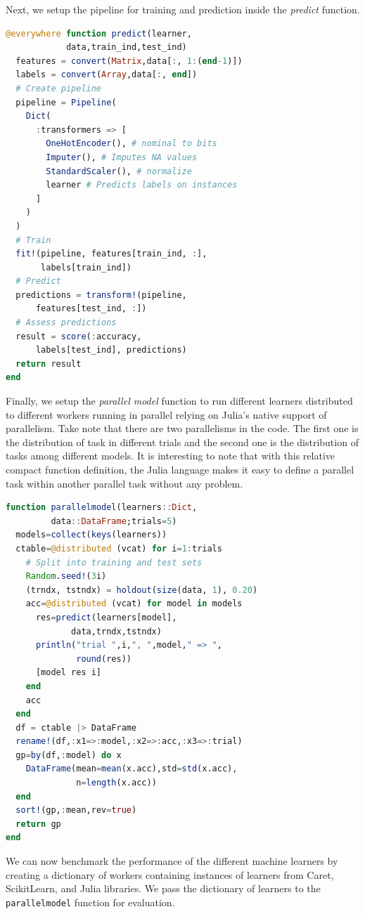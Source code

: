 \documentclass{juliacon}
\begin{document}
Next, we setup the pipeline for training and prediction inside the \emph{predict} function.

\begin{lstlisting}[language = Julia]
@everywhere function predict(learner,
            data,train_ind,test_ind)        
  features = convert(Matrix,data[:, 1:(end-1)])
  labels = convert(Array,data[:, end])
  # Create pipeline
  pipeline = Pipeline(
    Dict(
      :transformers => [
        OneHotEncoder(), # nominal to bits
        Imputer(), # Imputes NA values
        StandardScaler(), # normalize
        learner # Predicts labels on instances
      ]
    )
  )
  # Train
  fit!(pipeline, features[train_ind, :],
       labels[train_ind])  
  # Predict
  predictions = transform!(pipeline, 
      features[test_ind, :])
  # Assess predictions
  result = score(:accuracy, 
      labels[test_ind], predictions)
  return result
end
\end{lstlisting}

Finally, we setup the \emph{parallel model} function to run different learners distributed to different workers running in parallel relying on Julia's native support of parallelism. Take note that there are two parallelisms in the code. The first one is the distribution of task in different trials and the second one is the distribution of tasks among different models. It is interesting to note that with this relative compact function definition, the Julia language makes it easy to define a parallel task within another parallel task without any problem.

\begin{lstlisting}[language = Julia]
function parallelmodel(learners::Dict,
         data::DataFrame;trials=5)
  models=collect(keys(learners))
  ctable=@distributed (vcat) for i=1:trials
    # Split into training and test sets
    Random.seed!(3i)
    (trndx, tstndx) = holdout(size(data, 1), 0.20)
    acc=@distributed (vcat) for model in models
      res=predict(learners[model],
             data,trndx,tstndx)
      println("trial ",i,", ",model," => ",
              round(res))
      [model res i]
    end
    acc
  end
  df = ctable |> DataFrame
  rename!(df,:x1=>:model,:x2=>:acc,:x3=>:trial)
  gp=by(df,:model) do x
    DataFrame(mean=mean(x.acc),std=std(x.acc),
              n=length(x.acc)) 
  end
  sort!(gp,:mean,rev=true)
  return gp
end
\end{lstlisting}

We can now benchmark the performance of the different machine learners by creating a dictionary of workers containing instances of learners from Caret, ScikitLearn, and Julia libraries. We pass the dictionary of learners to the \texttt{parallelmodel} function for evaluation.
\end{document}
